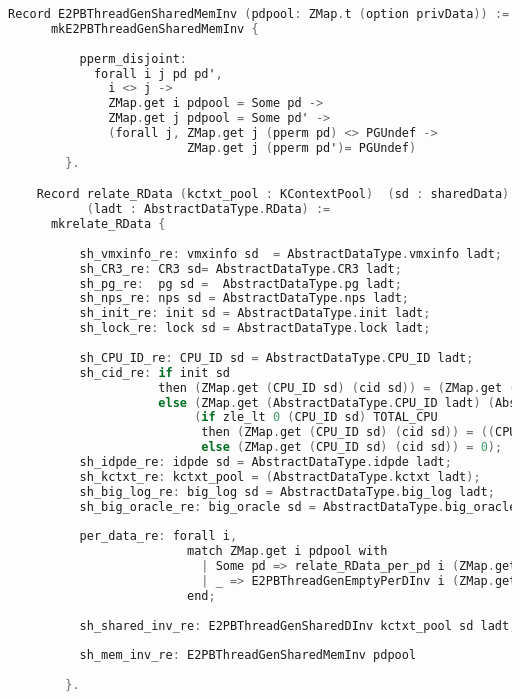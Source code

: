 \begin{lstlisting}[language=C]
    Record E2PBThreadGenSharedMemInv (pdpool: ZMap.t (option privData)) :=
      mkE2PBThreadGenSharedMemInv {
          
          pperm_disjoint: 
            forall i j pd pd',
              i <> j ->
              ZMap.get i pdpool = Some pd ->
              ZMap.get j pdpool = Some pd' ->
              (forall j, ZMap.get j (pperm pd) <> PGUndef ->
                         ZMap.get j (pperm pd')= PGUndef)
        }.

    Record relate_RData (kctxt_pool : KContextPool)  (sd : sharedData)  (pdpool: ZMap.t (option privData))
           (ladt : AbstractDataType.RData) :=
      mkrelate_RData {
          
          sh_vmxinfo_re: vmxinfo sd  = AbstractDataType.vmxinfo ladt;
          sh_CR3_re: CR3 sd= AbstractDataType.CR3 ladt;
          sh_pg_re:  pg sd =  AbstractDataType.pg ladt;
          sh_nps_re: nps sd = AbstractDataType.nps ladt;
          sh_init_re: init sd = AbstractDataType.init ladt;
          sh_lock_re: lock sd = AbstractDataType.lock ladt;
          
          sh_CPU_ID_re: CPU_ID sd = AbstractDataType.CPU_ID ladt;
          sh_cid_re: if init sd
                     then (ZMap.get (CPU_ID sd) (cid sd)) = (ZMap.get (AbstractDataType.CPU_ID ladt) (AbstractDataType.cid ladt))
                     else (ZMap.get (AbstractDataType.CPU_ID ladt) (AbstractDataType.cid ladt)) = 0 /\
                          (if zle_lt 0 (CPU_ID sd) TOTAL_CPU
                           then (ZMap.get (CPU_ID sd) (cid sd)) = ((CPU_ID sd) + 1)
                           else (ZMap.get (CPU_ID sd) (cid sd)) = 0);
          sh_idpde_re: idpde sd = AbstractDataType.idpde ladt;
          sh_kctxt_re: kctxt_pool = (AbstractDataType.kctxt ladt);
          sh_big_log_re: big_log sd = AbstractDataType.big_log ladt;
          sh_big_oracle_re: big_oracle sd = AbstractDataType.big_oracle ladt;
          
          per_data_re: forall i,
                         match ZMap.get i pdpool with 
                           | Some pd => relate_RData_per_pd i (ZMap.get i kctxt_pool) sd pd ladt
                           | _ => E2PBThreadGenEmptyPerDInv i (ZMap.get i kctxt_pool)  sd ladt
                         end;
          
          sh_shared_inv_re: E2PBThreadGenSharedDInv kctxt_pool sd ladt;
          
          sh_mem_inv_re: E2PBThreadGenSharedMemInv pdpool 
                                                    
        }.
\end{lstlisting}
